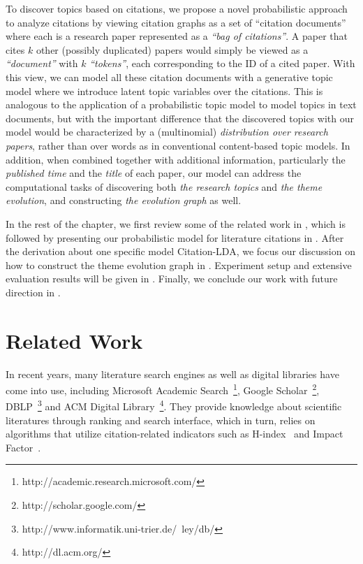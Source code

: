 To discover topics based on citations, we propose a novel probabilistic approach
to analyze citations by viewing citation graphs as a set of ``citation
documents'' where each is a research paper represented as a \emph{``bag of
citations''}. A paper that cites $k$ other (possibly duplicated) papers would
simply be viewed as a \emph{``document''} with $k$ \emph{``tokens''}, each
corresponding to the ID of a cited paper. With this view, we can model all these
citation documents with a generative topic model where we introduce latent topic
variables over the citations. This is analogous to the application of a
probabilistic topic model to model topics in text documents, but with the
important difference that the discovered topics with our model would be
characterized by a (multinomial) \emph{distribution over research papers},
rather than over words as in conventional content-based topic models. In
addition, when combined together with additional information, particularly the
\emph{published time} and the \emph{title} of each paper, our model can address
the computational tasks of discovering both \emph{the research topics} and
\emph{the theme evolution}, and constructing \emph{the evolution graph} as well.

In the rest of the chapter, we first review some of the related work in
, which is followed by presenting our probabilistic
model for literature citations in . After the
derivation about one specific model Citation-LDA, we focus our discussion on how
to construct the theme evolution graph in . Experiment
setup and extensive evaluation results will be given in
. Finally, we conclude our work with future direction in
.

\section{Related Work}\label{sec::citation-related}

In recent years, many literature search engines as well as digital libraries
have come into use, including Microsoft Academic
Search~\footnote{http://academic.research.microsoft.com/}, Google
Scholar~\footnote{ http://scholar.google.com/}, DBLP~\footnote{
http://www.informatik.uni-trier.de/~ley/db/} and ACM Digital
Library~\footnote{http://dl.acm.org/}. They provide knowledge about scientific
literatures through ranking and search interface, which in turn, relies on
algorithms that utilize citation-related indicators such as
H-index~\cite{hirsch2005index} and Impact Factor~\cite{garfield2006history}.

